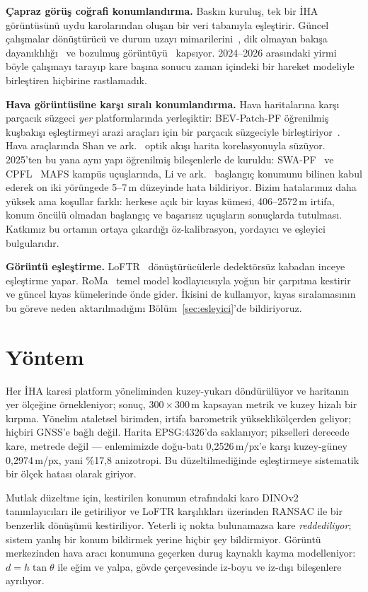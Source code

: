 \documentclass[conference]{IEEEtran}
\begin{document}
\textbf{Çapraz görüş coğrafi konumlandırma.} Baskın kuruluş, tek bir İHA
görüntüsünü uydu karolarından oluşan bir veri tabanıyla eşleştirir. Güncel
çalışmalar dönüştürücü ve durum uzayı mimarilerini~\cite{mgs2net}, dik olmayan
bakışa dayanıklılığı~\cite{offnadir} ve bozulmuş görüntüyü~\cite{relate}
kapsıyor. 2024--2026 arasındaki yirmi böyle çalışmayı tarayıp kare başına
sonucu zaman içindeki bir hareket modeliyle birleştiren hiçbirine rastlamadık.

\textbf{Hava görüntüsüne karşı sıralı konumlandırma.} Hava haritalarına karşı
parçacık süzgeci \emph{yer} platformlarında yerleşiktir: BEV-Patch-PF öğrenilmiş
kuşbakışı eşleştirmeyi arazi araçları için bir parçacık süzgeciyle
birleştiriyor~\cite{bevpatchpf}. Hava araçlarında Shan ve ark.~\cite{shan}
optik akışı harita korelasyonuyla süzüyor. 2025'ten bu yana aynı yapı
öğrenilmiş bileşenlerle de kuruldu: SWA-PF~\cite{swapf} ve CPFL~\cite{cpfl}
MAFS kampüs uçuşlarında, Li ve ark.~\cite{gimpf} başlangıç konumunu bilinen
kabul ederek on iki yörüngede 5--7\,m düzeyinde hata bildiriyor. Bizim
hatalarımız daha yüksek ama koşullar farklı: herkese açık bir kıyas kümesi,
406--2572\,m irtifa, konum öncülü olmadan başlangıç ve başarısız uçuşların
sonuçlarda tutulması. Katkımız bu ortamın ortaya çıkardığı öz-kalibrasyon,
yordayıcı ve eşleyici bulgularıdır.

\textbf{Görüntü eşleştirme.} LoFTR~\cite{loftr} dönüştürücülerle dedektörsüz
kabadan inceye eşleştirme yapar. RoMa~\cite{roma} temel model kodlayıcısıyla
yoğun bir çarpıtma kestirir ve güncel kıyas kümelerinde önde gider. İkisini de
kullanıyor, kıyas sıralamasının bu göreve neden aktarılmadığını
Bölüm~\ref{sec:esleyici}'de bildiriyoruz.

\section{Yöntem}

Her İHA karesi platform yöneliminden kuzey-yukarı döndürülüyor ve haritanın yer
ölçeğine örnekleniyor; sonuç, $300 \times 300$\,m kapsayan metrik ve kuzey
hizalı bir kırpma. Yönelim ataletsel birimden, irtifa barometrik
yükseklikölçerden geliyor; hiçbiri GNSS'e bağlı değil. Harita EPSG:4326'da
saklanıyor; pikselleri derecede kare, metrede değil --- enlemimizde doğu-batı
0,2526\,m/px'e karşı kuzey-güney 0,2974\,m/px, yani \%17,8 anizotropi. Bu
düzeltilmediğinde eşleştirmeye sistematik bir ölçek hatası olarak giriyor.

Mutlak düzeltme için, kestirilen konumun etrafındaki karo DINOv2 tanımlayıcıları
ile getiriliyor ve LoFTR karşılıkları üzerinden RANSAC ile bir benzerlik
dönüşümü kestiriliyor. Yeterli iç nokta bulunamazsa kare \emph{reddediliyor};
sistem yanlış bir konum bildirmek yerine hiçbir şey bildirmiyor. Görüntü
merkezinden hava aracı konumuna geçerken duruş kaynaklı kayma modelleniyor:
$d = h\tan\theta$ ile eğim ve yalpa, gövde çerçevesinde iz-boyu ve iz-dışı
bileşenlere ayrılıyor.
\end{document}
